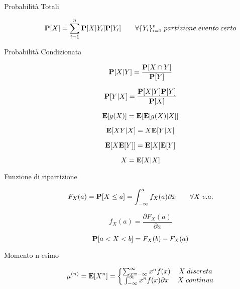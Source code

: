 \begin{description}
	\item[Probabilità Totali]
		\begin{equation}
		\mathbf{P}[X]=\sum_{i=1}^{n}\mathbf{P}[X|Y_{i}]\mathbf{P}[Y_{i}]
		\qquad
		\forall \{Y_{i}\}_{i=1}^{n}\;partizione\;evento\;certo
		\end{equation}
	
	\item[Probabilità Condizionata]
		\begin{equation}
		\mathbf{P}[X|Y]=\frac{\mathbf{P}[X \cap Y]}{\mathbf{P}[Y]}
		\end{equation}
		
		\begin{equation}
		\mathbf{P}[Y|X]=\frac{\mathbf{P}[X|Y]\mathbf{P}[Y]}{\mathbf{P}[X]}
		\end{equation}
		
		\begin{equation}
		\mathbf{E}[g(X)] = \mathbf{E}[\mathbf{E}[g(X)|X]]
		\end{equation}
		
		\begin{equation}
		\mathbf{E}[XY|X] = X\mathbf{E}[Y|X]
		\end{equation}
		
		\begin{equation}
		\mathbf{E}[X\mathbf{E}[Y]] = \mathbf{E}[X]\mathbf{E}[Y]
		\end{equation}
		
		\begin{equation}
		X=\mathbf{E}[X|X]
		\end{equation}
	
	\item [Funzione di ripartizione]
		\begin{equation}
		F_{X}(a) = \mathbf{P}[X \leq a] = \int_{-\infty}^{a} f_{X}(a) \partial x \qquad\forall X \; v.a.
		\end{equation}
		
		\begin{equation}
		f_{X}(a) = \frac{\partial F_{X}(a)}{\partial a}
		\end{equation}
		
		\begin{equation}
		\mathbf{P}[a<X<b]=F_{X}(b)-F_{X}(a)
		\end{equation}
	\item [Momento n-esimo]	
		\begin{equation}
		\mu^{(n)}=\mathbf{E}[X^{n}] = \left\{\begin{matrix}
		\sum_{x=-\infty}^{\infty} x^{n} f(x) & X \; discreta \\
		\int_{-\infty}^{\infty} x^{n} f(x) \partial x & X \; continua
		\end{matrix}\right.
		\end{equation}
		

\end{description}
